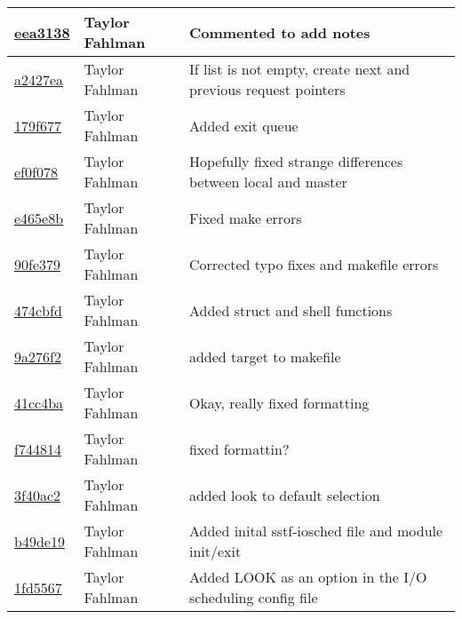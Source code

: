 \begin{tabular}{l l l}
\href{https://github.com/fahlmant/cs444/commit/eea31387ddd4b439198607910a6025a957d4ce2b}{eea3138} & Taylor Fahlman & Commented to add notes\\\hline
\href{https://github.com/fahlmant/cs444/commit/a2427eaa94cfc72c3c636d359e1ff18729c50803}{a2427ea} & Taylor Fahlman & If list is not empty, create next and previous request pointers\\\hline
\href{https://github.com/fahlmant/cs444/commit/179f677a63ce6e59233d66e1696cc2a2c6da4f94}{179f677} & Taylor Fahlman & Added exit queue\\\hline
\href{https://github.com/fahlmant/cs444/commit/ef0f078626f6b3779db8239cfadefc9b0eb57422}{ef0f078} & Taylor Fahlman & Hopefully fixed strange differences between local and master\\\hline
\href{https://github.com/fahlmant/cs444/commit/e465e8bca4a176e46eec39c9506fcbbeaa52346d}{e465e8b} & Taylor Fahlman & Fixed make errors\\\hline
\href{https://github.com/fahlmant/cs444/commit/90fe379dcec284aec20892a7b5dfed7418d1f629}{90fe379} & Taylor Fahlman & Corrected typo fixes and makefile errors\\\hline
\href{https://github.com/fahlmant/cs444/commit/474cbfd6cf240364ec4739b91d21f0a08efa0507}{474cbfd} & Taylor Fahlman & Added struct and shell functions\\\hline
\href{https://github.com/fahlmant/cs444/commit/9a276f27141dec3a008c5ff9b3f53302579d55dc}{9a276f2} & Taylor Fahlman & added target to makefile\\\hline
\href{https://github.com/fahlmant/cs444/commit/41cc4baab6306e573e7cebb13ab23eba9ee28942}{41cc4ba} & Taylor Fahlman & Okay, really fixed formatting\\\hline
\href{https://github.com/fahlmant/cs444/commit/f744814a5f73441d92f08e7ec4c1734b8effe233}{f744814} & Taylor Fahlman & fixed formattin?\\\hline
\href{https://github.com/fahlmant/cs444/commit/3f40ac2f576b2250e924524e3c7973a7b57b99dc}{3f40ac2} & Taylor Fahlman & added look to default selection\\\hline
\href{https://github.com/fahlmant/cs444/commit/b49de190dda284a50bb2738f40b8436171b9d691}{b49de19} & Taylor Fahlman & Added inital sstf-iosched file and module init/exit\\\hline
\href{https://github.com/fahlmant/cs444/commit/1fd55679562034d28fcfbb6e2ac1642c5c88dfc9}{1fd5567} & Taylor Fahlman & Added LOOK as an option in the I/O scheduling config file\\\hline

\end{tabular}
